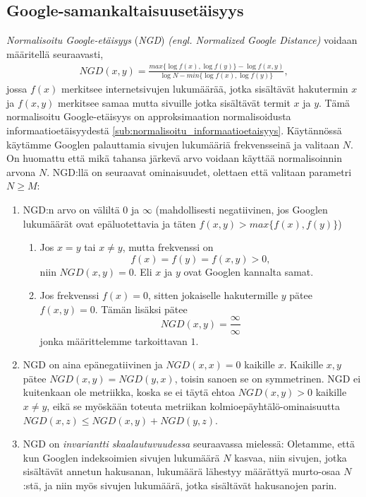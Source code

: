 \documentclass[12pt,finnish]{tktltiki2}
\theoremstyle{definition}
\theoremstyle{remark}
\newcommand{\engl}[1]{\emph{(engl. #1)}}
\begin{document}
    \subsection{Google-samankaltaisuusetäisyys} %
    \label{sub:google_samankaltaisuusetaisyys}
      \emph{Normalisoitu Google-etäisyys} (\emph{NGD}) \engl{Normalized Google Distance}  voidaan määritellä seuraavasti,
      \begin{align}
        NGD(x,y) = \frac{max\{\log{f(x)},\log{f(y)}\}-\log{f(x,y)}}{\log{N}-min\{\log{f(x)},\log{f(y)}\}},
      \end{align}
      jossa $f(x)$ merkitsee internetsivujen lukumäärää, jotka sisältävät hakutermin $x$ ja $f(x,y)$ merkitsee samaa mutta sivuille jotka sisältävät termit $x$ ja $y$.
      Tämä normalisoitu Google-etäisyys on approksimaation normalisoidusta informaatioetäisyydestä \ref{sub:normalisoitu_informaatioetaisyys}.
      Käytännössä käytämme Googlen palauttamia sivujen lukumääriä frekvensseinä ja valitaan $N$.
      On huomattu että mikä tahansa järkevä arvo voidaan käyttää normalisoinnin arvona $N$.
      NGD:llä on seuraavat ominaisuudet, olettaen että valitaan parametri $N\geq{}M$:
      \begin{enumerate}
        \item NGD:n arvo on väliltä $0$ ja $\infty$ (mahdollisesti negatiivinen, jos Googlen lukumäärät ovat epäluotettavia ja täten $f(x,y) > max\{f(x),f(y)\}$)
        \begin{enumerate}
          \item Jos $x=y$ tai $x\neq{}y$, mutta frekvenssi on
          \[
            f(x) = f(y) = f(x,y) > 0,
          \]
          niin $NGD(x,y)=0$. Eli $x$ ja $y$ ovat Googlen kannalta samat.
          \item Jos frekvenssi $f(x)=0$, sitten jokaiselle hakutermille $y$ pätee $f(x,y)=0$. Tämän lisäksi pätee
          \[
            NGD(x,y)=\frac{\infty}{\infty}
          \]
          jonka määrittelemme tarkoittavan $1$.
        \end{enumerate}
        \item NGD on aina epänegatiivinen ja $NGD(x,x)=0$ kaikille $x$. Kaikille $x,y$ pätee $NGD(x,y)=NGD(y,x)$, toisin sanoen se on symmetrinen. NGD ei kuitenkaan ole metriikka, koska se ei täytä ehtoa $NGD(x,y) > 0$ kaikille $x\neq{}y$, eikä se myöskään toteuta metriikan kolmioepäyhtälö-ominaisuutta $NGD(x,z) \leq NGD(x,y) + NGD(y,z)$. \cite{cilibrasi2007google}
        \item NGD on \emph{invariantti skaalautuvuudessa} seuraavassa mielessä: Oletamme, että kun Googlen indeksoimien sivujen lukumäärä $N$ kasvaa, niin sivujen, jotka sisältävät annetun hakusanan, lukumäärä lähestyy määrättyä murto-osaa $N$:stä, ja niin myös sivujen lukumäärä, jotka sisältävät hakusanojen parin.
      \end{enumerate}
\end{document}
